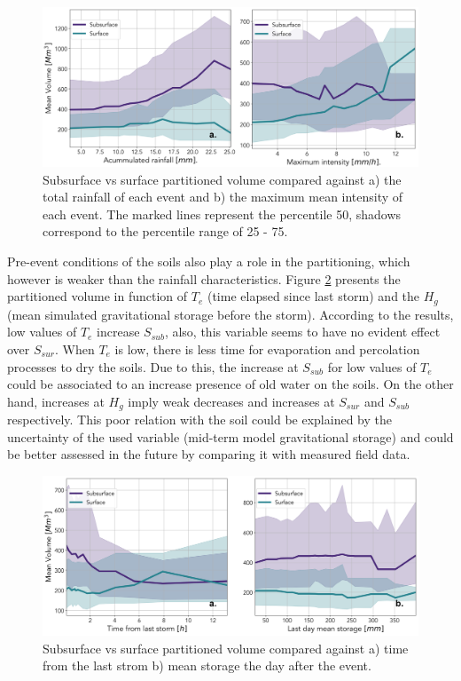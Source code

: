 \documentclass[preprint,12pt]{elsarticle}
\begin{document}
\begin{figure}[H]
    \centering
    \includegraphics[width=14cm]{Figuras/MeanVolumeVsRainfall}
    \caption{Subsurface vs surface partitioned volume compared against a) the total rainfall of each event and b) the maximum mean intensity of each event.  The marked lines represent the percentile 50, shadows correspond to the percentile range of 25 - 75.}
    \label{fig:volumeVsRainfall}
\end{figure}
Pre-event conditions of the soils also play a role in the partitioning, which however is weaker than the rainfall characteristics.  Figure \ref{fig:volumeVsSoil} presents the partitioned volume in function of $T_e$ (time elapsed since last storm) and the $H_g$ (mean simulated gravitational storage before the storm).  According to the results, low values of $T_e$ increase $S_{sub}$, also, this variable seems to have no evident effect over $S_{sur}$.  When $T_e$ is low, there is less time for evaporation and percolation processes to dry the soils. Due to this, the increase at $S_{sub}$ for low values of $T_e$ could be associated to an increase presence of old water on the soils.  On the other hand, increases at $H_g$ imply weak decreases and increases at  $S_{sur}$ and $S_{sub}$ respectively.  This poor relation with the soil could be explained by the uncertainty of the used variable (mid-term model gravitational storage) and could be better assessed in the future by comparing it with measured field data.\\

\begin{figure}[!h]
    \centering
    \includegraphics[width=14cm]{Figuras/MeanVolumeVsSoil}
    \caption{Subsurface vs surface partitioned volume compared against a) time from the last strom b) mean storage the day after the event.}
    \label{fig:volumeVsSoil}
\end{figure}
\end{document}
